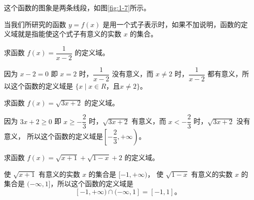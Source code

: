 \jie 这个函数的图象是两条线段，如图\ref{fig:1-7}所示。

当我们所研究的函数 $y=f(x)$ 是用一个式子表示时，如果不加说明，函数的定义域就是指能使这个式子有意义的实数 $x$ 的集合。

\liti 求函数 $f(x) = \dfrac{1}{x -2}$ 的定义域。

\jie 因为 $x-2=0$ 即 $x=2$ 时，$\dfrac{1}{x - 2}$ 没有意义，而 $x \neq 2$ 时，$\dfrac{1}{x - 2}$ 都有意义，所以这个函数的定义域是
$\{x \mid x \in R \text{，且} x \neq 2\} \text{。}$

\liti 求函数 $f(x) = \sqrt{3x+2}$ 的定义域。

\jie 因为 $3x+2 \geqslant 0$ 即 $x \geqslant -\dfrac 2 3$ 时，$\sqrt{3x+2}$ 有意义，而 $x < -\dfrac 2 3$ 时，$\sqrt{3x+2}$ 没有意义，
所以这个函数的定义域是$\left[ -\dfrac 2 3 , +\infty \right)$。

\liti 求函数 $f(x) = \sqrt{x+1} + \sqrt{1-x} + 2$ 的定义域。

\jie 使 $\sqrt{x+1}$ 有意义的实数 $x$ 的集合是 $[-1, +\infty)$，
使 $\sqrt{1-x}$ 有意义的实数 $x$ 的集合是 $(-\infty, 1]$，所以这个函数的定义域是
$$[-1, +\infty) \cap (-\infty, 1] = [-1, 1] \text{。}$$

\lianxi

